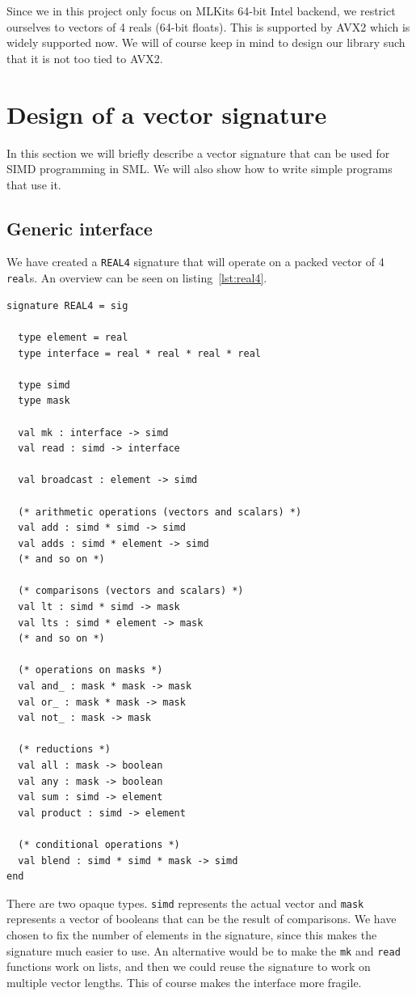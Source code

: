 \documentclass{article}
\begin{document}
Since we in this project only focus on MLKits 64-bit Intel backend, we restrict ourselves to vectors of 4 reals (64-bit floats). This is supported by AVX2 which is widely supported now. We will of course keep in mind to design our library such that it is not too tied to AVX2.

\section{Design of a vector signature}

In this section we will briefly describe a vector signature that can be used for SIMD programming in SML. We will also show how to write simple programs that use it.

\subsection{Generic interface}

We have created a \verb!REAL4! signature that will operate on a packed vector of 4 \verb!real!s. An overview can be seen on listing~\ref{lst:real4}.

\begin{lstlisting}[frame=single, caption=\texttt{REAL4} vector signature, label={lst:real4}]
signature REAL4 = sig

  type element = real
  type interface = real * real * real * real

  type simd
  type mask

  val mk : interface -> simd
  val read : simd -> interface

  val broadcast : element -> simd

  (* arithmetic operations (vectors and scalars) *)
  val add : simd * simd -> simd
  val adds : simd * element -> simd
  (* and so on *)

  (* comparisons (vectors and scalars) *)
  val lt : simd * simd -> mask
  val lts : simd * element -> mask
  (* and so on *)

  (* operations on masks *)
  val and_ : mask * mask -> mask
  val or_ : mask * mask -> mask
  val not_ : mask -> mask

  (* reductions *)
  val all : mask -> boolean
  val any : mask -> boolean
  val sum : simd -> element
  val product : simd -> element

  (* conditional operations *)
  val blend : simd * simd * mask -> simd
end
\end{lstlisting}

There are two opaque types. \verb!simd! represents the actual vector and \verb!mask! represents a vector of booleans that can be the result of comparisons. We have chosen to fix the number of elements in the signature, since this makes the signature much easier to use. An alternative would be to make the \verb!mk! and \verb!read! functions work on lists, and then we could reuse the signature to work on multiple vector lengths. This of course makes the interface more fragile.
\end{document}
